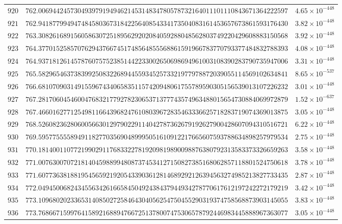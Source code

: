 \documentclass[12pt,reqno]{amsart}
\theoremstyle{remark}
\begin{document}
\begin{longtable}{clc}
$920$ & $762.0069442457304939791949462145314834780578732164011101110843671364222597$ & $4.65\times 10^{-448}$ \\
$921$ & $762.9418779949474845803673184225640854334173504083161453657673861593176430$ & $3.82\times 10^{-448}$ \\
$922$ & $763.3082616891560586307251895629202084059288048562803749220429608883150568$ & $3.92\times 10^{-448}$ \\
$923$ & $764.3770152585707629437667451748564855568861591966783770793377484832788393$ & $4.08\times 10^{-448}$ \\
$924$ & $764.9371812614578760757523851442233002650698694961003108390283790735947006$ & $3.31\times 10^{-448}$ \\
$925$ & $765.5829654637383992508322689445593452573321977978872039055114569102634841$ & $8.65\times 10^{-537}$ \\
$926$ & $766.6810709031491559674340658351157420948061755789590305156539013107226232$ & $3.01\times 10^{-448}$ \\
$927$ & $767.2817060454600476832177927823065371377743574963488015654730884069972879$ & $1.52\times 10^{-637}$ \\
$928$ & $767.4660162771254981166439682476108039672835463336625718283719074369013875$ & $3.05\times 10^{-448}$ \\
$929$ & $768.5260823628060056630129790229114042787362679192627900428607094310516721$ & $6.22\times 10^{-448}$ \\
$930$ & $769.5957755558949118277035690489995051610912217665607593788634898257979534$ & $2.75\times 10^{-448}$ \\
$931$ & $770.1814001107721990291176833227819209819890098876380792313583373326659263$ & $3.58\times 10^{-448}$ \\
$932$ & $771.0076300707218140459889948087374534127150827385168062857118801524750618$ & $3.78\times 10^{-448}$ \\
$933$ & $771.6077363818819545659219205433903612814689292126394563274985213827733435$ & $2.87\times 10^{-448}$ \\
$934$ & $772.0494500682434556342616658450492438437944934278770617612197242272179219$ & $3.42\times 10^{-448}$ \\
$935$ & $773.1096802023365314085027258464304056254750455290319374758568873903145055$ & $3.83\times 10^{-448}$ \\
$936$ & $773.7686671599764158921688947667251378007475306578792446983445888967363077$ & $3.05\times 10^{-448}$ \\

\end{longtable}
\end{document}
